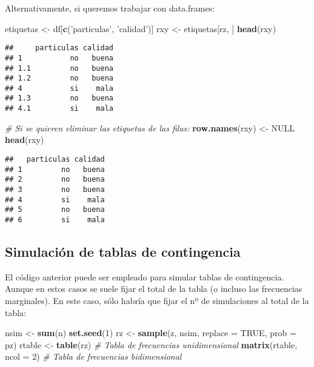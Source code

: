\documentclass[
]{book}
\newenvironment{Shaded}{\begin{snugshade}}{\end{snugshade}}
\newcommand{\CommentTok}[1]{\textcolor[rgb]{0.56,0.35,0.01}{\textit{#1}}}
\newcommand{\DataTypeTok}[1]{\textcolor[rgb]{0.13,0.29,0.53}{#1}}
\newcommand{\DecValTok}[1]{\textcolor[rgb]{0.00,0.00,0.81}{#1}}
\newcommand{\KeywordTok}[1]{\textcolor[rgb]{0.13,0.29,0.53}{\textbf{#1}}}
\newcommand{\NormalTok}[1]{#1}
\newcommand{\OtherTok}[1]{\textcolor[rgb]{0.56,0.35,0.01}{#1}}
\newcommand{\StringTok}[1]{\textcolor[rgb]{0.31,0.60,0.02}{#1}}
\theoremstyle{break}
\theoremstyle{definition}
\theoremstyle{definition}
\theoremstyle{definition}
\theoremstyle{remark}
\begin{document}
Alternativamente, si queremos trabajar con data.frames:

\begin{Shaded}
\begin{Highlighting}[]
\NormalTok{etiquetas <-}\StringTok{ }\NormalTok{df[}\KeywordTok{c}\NormalTok{(}\StringTok{'particulas'}\NormalTok{, }\StringTok{'calidad'}\NormalTok{)]}
\NormalTok{rxy <-}\StringTok{ }\NormalTok{etiquetas[rz, ]}
\KeywordTok{head}\NormalTok{(rxy)}
\end{Highlighting}
\end{Shaded}

\begin{verbatim}
##     particulas calidad
## 1           no   buena
## 1.1         no   buena
## 1.2         no   buena
## 4           si    mala
## 1.3         no   buena
## 4.1         si    mala
\end{verbatim}

\begin{Shaded}
\begin{Highlighting}[]
\CommentTok{# Si se quieren eliminar las etiquetas de las filas:}
\KeywordTok{row.names}\NormalTok{(rxy) <-}\StringTok{ }\OtherTok{NULL}
\KeywordTok{head}\NormalTok{(rxy)}
\end{Highlighting}
\end{Shaded}

\begin{verbatim}
##   particulas calidad
## 1         no   buena
## 2         no   buena
## 3         no   buena
## 4         si    mala
## 5         no   buena
## 6         si    mala
\end{verbatim}

\hypertarget{simconting}{%
\subsection{Simulación de tablas de contingencia}\label{simconting}}

El código anterior puede ser empleado para simular tablas de contingencia.
Aunque en estos casos se suele fijar el total de la tabla (o incluso las frecuencias marginales).
En este caso, sólo habría que fijar el nº de simulaciones al total de la tabla:

\begin{Shaded}
\begin{Highlighting}[]
\NormalTok{nsim <-}\StringTok{ }\KeywordTok{sum}\NormalTok{(n)}
\KeywordTok{set.seed}\NormalTok{(}\DecValTok{1}\NormalTok{)}
\NormalTok{rz <-}\StringTok{ }\KeywordTok{sample}\NormalTok{(z, nsim, }\DataTypeTok{replace =} \OtherTok{TRUE}\NormalTok{, }\DataTypeTok{prob =}\NormalTok{ pz)}
\NormalTok{rtable <-}\StringTok{ }\KeywordTok{table}\NormalTok{(rz) }\CommentTok{# Tabla de frecuencias unidimensional}
\KeywordTok{matrix}\NormalTok{(rtable, }\DataTypeTok{ncol =} \DecValTok{2}\NormalTok{) }\CommentTok{# Tabla de frecuencias bidimensional}
\end{Highlighting}
\end{Shaded}
\end{document}
